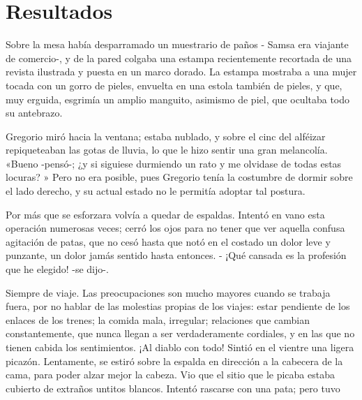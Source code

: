 \section{Resultados}

Sobre la mesa había desparramado un muestrario de paños - Samsa era viajante de comercio-, y de la pared colgaba una estampa recientemente recortada de una revista ilustrada y puesta en un marco dorado. La estampa mostraba a una mujer tocada con un gorro de pieles, envuelta en una estola también de pieles, y que, muy erguida, esgrimía un amplio manguito, asimismo de piel, que ocultaba todo su antebrazo.

Gregorio miró hacia la ventana; estaba nublado, y sobre el cinc del alféizar repiqueteaban las gotas de lluvia, lo que le hizo sentir una gran melancolía. «Bueno -pensó-; ¿y si siguiese durmiendo un rato y me olvidase de todas estas locuras? » Pero no era posible, pues Gregorio tenía la costumbre de dormir sobre el lado derecho, y su actual estado no le permitía adoptar tal postura.

Por más que se esforzara volvía a quedar de espaldas. Intentó en vano esta operación numerosas veces; cerró los ojos para no tener que ver aquella confusa agitación de patas, que no cesó hasta que notó en el costado un dolor leve y punzante, un dolor jamás sentido hasta entonces. - ¡Qué cansada es la profesión que he elegido! -se dijo-.

Siempre de viaje. Las preocupaciones son mucho mayores cuando se trabaja fuera, por no hablar de las molestias propias de los viajes: estar pendiente de los enlaces de los trenes; la comida mala, irregular; relaciones que cambian constantemente, que nunca llegan a ser verdaderamente cordiales, y en las que no tienen cabida los sentimientos. ¡Al diablo con todo! Sintió en el vientre una ligera picazón. Lentamente, se estiró sobre la espalda en dirección a la cabecera de la cama, para poder alzar mejor la cabeza. Vio que el sitio que le picaba estaba cubierto de extraños untitos blancos. Intentó rascarse con una pata; pero tuvo